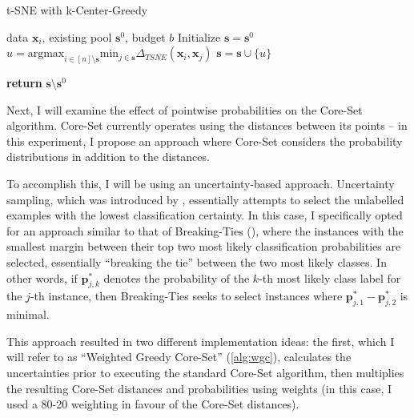 \documentclass[english,bachelor,ul]{webisthesis} %
\begin{document}
\begin{algorithm}
\caption{t-SNE with k-Center-Greedy}%
\makeatletter{}\makeatother
\label{alg:coreset-tsne}
\begin{algorithmic}


\Require data $ \mathbf{x}_i $, existing pool $ \mathbf{s}^0 $, budget $ b $
\State Initialize $ \mathbf{s} = \mathbf{s}^0 $
\Repeat
\State $ u = \text{argmax}_{i \in [n] \setminus \mathbf{s}} \text{min}_{j \in \mathbf{s}} \Delta_{TSNE}(\mathbf{x}_i, \mathbf{x}_j) $
\State $ \mathbf{s} = \mathbf{s} \cup \{u\} $

\State \textbf{return} $\mathbf{s} \setminus \mathbf{s}^0 $
\end{algorithmic}
\end{algorithm}

Next, I will examine the effect of pointwise probabilities on the Core-Set algorithm. Core-Set currently operates using the distances between its points -- in this experiment, I propose an approach where Core-Set considers the probability distributions in addition to the distances. 

To accomplish this, I will be using an uncertainty-based approach. Uncertainty sampling, which was introduced by \cite{DBLP:conf/sigir/LewisG94}, essentially attempts to select the unlabelled examples with the lowest classification certainty. In this case, I specifically opted for an approach similar to that of Breaking-Ties (\cite{DBLP:journals/jmlr/LuoKGHSRH05}), where the instances with the smallest margin between their top two most likely classification probabilities are selected, essentially ``breaking the tie'' between the two most likely classes. In other words, if $ \mathbf{p}_{j, k}^* $ denotes the probability of the $ k $-th most likely class label for the $ j $-th instance, then Breaking-Ties seeks to select instances where $ \mathbf{p}_{j, 1}^* - \mathbf{p}_{j, 2}^* $ is minimal.

This approach resulted in two different implementation ideas: the first, which I will refer to as ``Weighted Greedy Core-Set'' (\ref{alg:wgc}), calculates the uncertainties prior to executing the standard Core-Set algorithm, then multiplies the resulting Core-Set distances and probabilities using weights (in this case, I used a 80-20 weighting in favour of the Core-Set distances). 
\end{document}
